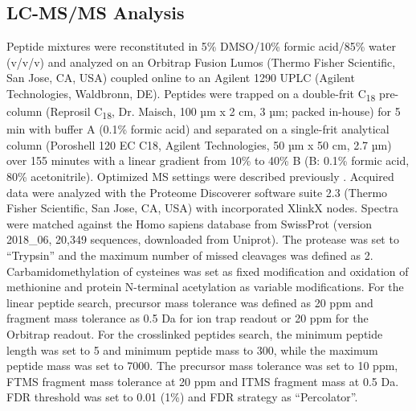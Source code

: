 \subsection{LC-MS/MS Analysis}
Peptide mixtures were reconstituted in 5\% DMSO/10\% formic acid/85\% water (v/v/v) and analyzed on an Orbitrap Fusion Lumos (Thermo Fisher Scientific, San Jose, CA, USA) coupled online to an Agilent 1290 UPLC (Agilent Technologies, Waldbronn, DE). Peptides were trapped on a double-frit C\textsubscript{18} pre-column (Reprosil C\textsubscript{18}, Dr. Maisch, 100 µm x 2 cm, 3 µm; packed in-house) for 5 min with buffer A (0.1\% formic acid) and separated on a single-frit analytical column (Poroshell 120 EC C18, Agilent Technologies, 50 µm x 50 cm, 2.7 µm) over 155 minutes with a linear gradient from 10\% to 40\% B (B: 0.1\% formic acid, 80\% acetonitrile). Optimized MS settings were described previously \cite{liu2017optimized, klykov2018efficient}. Acquired data were analyzed with the Proteome Discoverer software suite 2.3 (Thermo Fisher Scientific, San Jose, CA, USA) with incorporated XlinkX nodes. Spectra were matched against the Homo sapiens database from SwissProt (version 2018\_06, 20,349 sequences, downloaded from Uniprot). The protease was set to “Trypsin” and the maximum number of missed cleavages was defined as 2. Carbamidomethylation of cysteines was set as fixed modification and oxidation of methionine and protein N-terminal acetylation as variable modifications. For the linear peptide search, precursor mass tolerance was defined as 20 ppm and fragment mass tolerance as 0.5 Da for ion trap readout or 20 ppm for the Orbitrap readout. For the crosslinked peptides search, the minimum peptide length was set to 5 and minimum peptide mass to 300, while the maximum peptide mass was set to 7000. The precursor mass tolerance was set to 10 ppm, FTMS fragment mass tolerance at 20 ppm and ITMS fragment mass at 0.5 Da. FDR threshold was set to 0.01 (1\%) and FDR strategy as “Percolator”.



